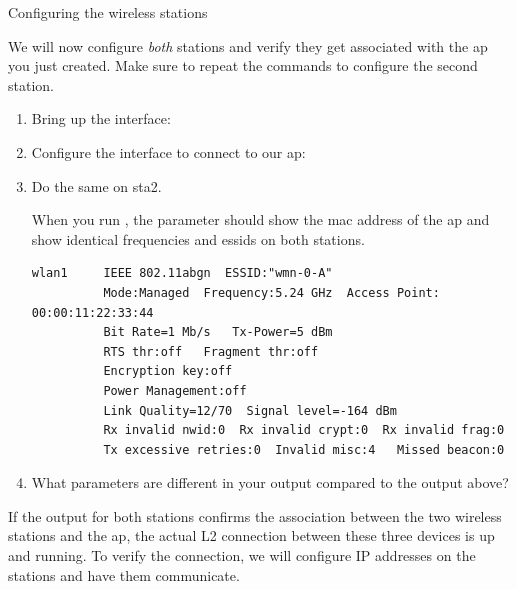 \begin{exercise}{Configuring the wireless stations}
	
We will now configure \emph{both} stations  and verify they get associated with the \ac{ap} you just created. Make sure to repeat the commands to configure the second station.

\begin{enumerate}
	\item Bring up the interface: \newline
	\item Configure the interface to connect to our \ac{ap}: \newline
	\item Do the same on \ac{sta}2.



\remark When you run , the  parameter should show the \ac{mac} address of the \ac{ap} and show identical frequencies and \acp{essid} on both stations. 
\begin{verbatim}
wlan1     IEEE 802.11abgn  ESSID:"wmn-0-A"  
          Mode:Managed  Frequency:5.24 GHz  Access Point: 00:00:11:22:33:44   
          Bit Rate=1 Mb/s   Tx-Power=5 dBm   
          RTS thr:off   Fragment thr:off
          Encryption key:off
          Power Management:off
          Link Quality=12/70  Signal level=-164 dBm  
          Rx invalid nwid:0  Rx invalid crypt:0  Rx invalid frag:0
          Tx excessive retries:0  Invalid misc:4   Missed beacon:0
\end{verbatim}
	\item What parameters are different in your output compared to the output above?\newline
	\begin{esolution}
	\end{esolution}
\end{enumerate}
\end{exercise}

If the output for both stations confirms the association between the two wireless stations and the \ac{ap}, the actual L2 connection between these three devices is up and running. To verify the connection, we will configure IP addresses on the stations and have them communicate.

